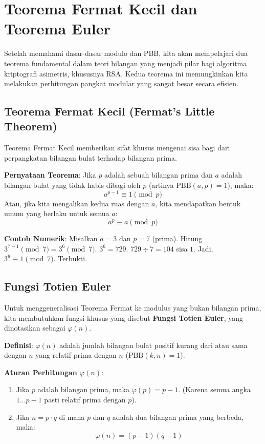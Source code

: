 \section{Teorema Fermat Kecil dan Teorema Euler}

Setelah memahami dasar-dasar modulo dan PBB, kita akan mempelajari dua teorema fundamental dalam teori bilangan yang menjadi pilar bagi algoritma kriptografi asimetris, khususnya RSA. Kedua teorema ini memungkinkan kita melakukan perhitungan pangkat modular yang sangat besar secara efisien.

\subsection{Teorema Fermat Kecil (Fermat's Little Theorem)}

Teorema Fermat Kecil memberikan sifat khusus mengenai sisa bagi dari perpangkatan bilangan bulat terhadap bilangan prima.

\textbf{Pernyataan Teorema}:
Jika $p$ adalah sebuah bilangan prima dan $a$ adalah bilangan bulat yang tidak habis dibagi oleh $p$ (artinya $\text{PBB}(a, p) = 1$), maka:
\[ a^{p-1} \equiv 1 \pmod{p} \]
Atau, jika kita mengalikan kedua ruas dengan $a$, kita mendapatkan bentuk umum yang berlaku untuk semua $a$:
\[ a^p \equiv a \pmod{p} \]

\textbf{Contoh Numerik}:
Misalkan $a = 3$ dan $p = 7$ (prima).
Hitung $3^{7-1} \pmod{7} = 3^6 \pmod{7}$.
$3^6 = 729$.
$729 \div 7 = 104$ sisa $1$.
Jadi, $3^6 \equiv 1 \pmod{7}$. Terbukti.

\subsection{Fungsi Totien Euler}

Untuk menggeneralisasi Teorema Fermat ke modulus yang bukan bilangan prima, kita membutuhkan fungsi khusus yang disebut \textbf{Fungsi Totien Euler}, yang dinotasikan sebagai $\varphi(n)$.

\textbf{Definisi}: $\varphi(n)$ adalah jumlah bilangan bulat positif kurang dari atau sama dengan $n$ yang relatif prima dengan $n$ ($\text{PBB}(k, n) = 1$).

\textbf{Aturan Perhitungan $\varphi(n)$}:
\begin{enumerate}
    \item Jika $p$ adalah bilangan prima, maka $\varphi(p) = p - 1$. (Karena semua angka $1 \dots p-1$ pasti relatif prima dengan $p$).
    \item Jika $n = p \cdot q$ di mana $p$ dan $q$ adalah dua bilangan prima yang berbeda, maka:
    \[ \varphi(n) = (p-1)(q-1) \]
\end{enumerate}

